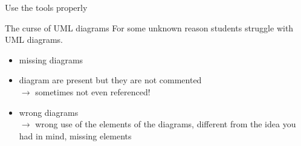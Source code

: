 \documentclass[presentation]{beamer}\mode<presentation>{\usetheme{AMSBolognaFC}}
\begin{document}
\begin{frame}[c,allowframebreaks]{Use the tools properly}
    
    \begin{figure}
        \centering
    \end{figure}
    
    \framebreak
    
    \begin{block}{The curse of UML diagrams}
        For some unknown reason students struggle with UML diagrams.
        \begin{itemize}
            \item missing diagrams
            \item diagram are present but they are not commented
            \\
            $\rightarrow$ \alert{sometimes not even referenced!}
            \item wrong diagrams
            \\
            $\rightarrow$ wrong use of the elements of the diagrams, different from the idea you had in mind, missing elements
        \end{itemize}
    \end{block}
    
    \framebreak
    

\end{frame}
\end{document}
